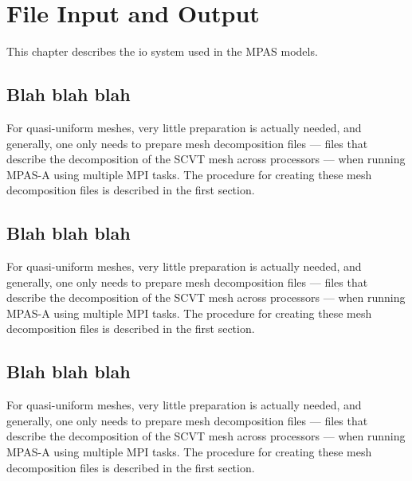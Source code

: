 \chapter{File Input and Output}
\label{chap:mpas_io}

This chapter describes the io system used in the MPAS models. 

\section{Blah blah blah}
\label{sec:io_overview} 

For quasi-uniform meshes, very little preparation is actually needed, and
generally, one only needs to prepare mesh decomposition files --- files that
describe the decomposition of the SCVT mesh across processors --- when running
MPAS-A using multiple MPI tasks. The procedure for creating these mesh
decomposition files is described in the first section. 

\section{Blah blah blah}
\label{sec:io_overview2} 

For quasi-uniform meshes, very little preparation is actually needed, and
generally, one only needs to prepare mesh decomposition files --- files that
describe the decomposition of the SCVT mesh across processors --- when running
MPAS-A using multiple MPI tasks. The procedure for creating these mesh
decomposition files is described in the first section. 

\section{Blah blah blah}
\label{sec:io_overview3} 

For quasi-uniform meshes, very little preparation is actually needed, and
generally, one only needs to prepare mesh decomposition files --- files that
describe the decomposition of the SCVT mesh across processors --- when running
MPAS-A using multiple MPI tasks. The procedure for creating these mesh
decomposition files is described in the first section. 
